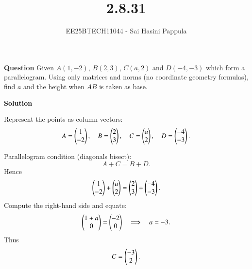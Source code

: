 \documentclass[journal]{IEEEtran}
\begin{document}

\vspace{3cm}

\title{2.8.31}
\author{EE25BTECH11044 - Sai Hasini Pappula}
 \maketitle
{\let\newpage\relax\maketitle}

\renewcommand{\thefigure}{\theenumi}
\renewcommand{\thetable}{\theenumi}
\setlength{\intextsep}{10pt} %


\renewcommand{\thetable}{\theenumi}

\textbf{Question}
Given $A(1,-2)$, $B(2,3)$, $C(a,2)$ and $D(-4,-3)$ which form a parallelogram. Using only matrices and norms (no coordinate geometry formulas), find $a$ and the height when $AB$ is taken as base. 

\bigskip

\textbf{Solution}

Represent the points as column vectors:
\begin{equation}
A=\begin{pmatrix}1\\-2\end{pmatrix},\quad B=\begin{pmatrix}2\\3\end{pmatrix},\quad C=\begin{pmatrix}a\\2\end{pmatrix},\quad D=\begin{pmatrix}-4\\-3\end{pmatrix}.
\end{equation}

Parallelogram condition (diagonals bisect): 
\begin{equation}
A+C=B+D.
\end{equation}
Hence
\begin{equation}
\begin{pmatrix}1\\-2\end{pmatrix}+\begin{pmatrix}a\\2\end{pmatrix}=\begin{pmatrix}2\\3\end{pmatrix}+\begin{pmatrix}-4\\-3\end{pmatrix}.
\end{equation}
Compute the right-hand side and equate:
\begin{equation}
\begin{pmatrix}1+a\\0\end{pmatrix}=\begin{pmatrix}-2\\0\end{pmatrix}\quad\Longrightarrow\quad a=-3.
\end{equation}
Thus
\begin{equation}
C=\begin{pmatrix}-3\\2\end{pmatrix}.
\end{equation}
\end{document}

